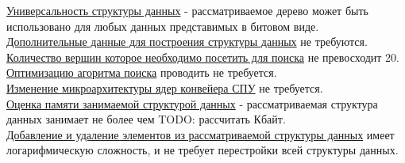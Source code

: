 \documentclass[a4peper, 12pt, titlepage, finall]{report}
\begin{document}
            \underline{Универсальность структуры данных} - рассматриваемое дерево может быть использовано для любых данных представимых в битовом виде.\\
            \underline{Дополнительные данные для построения структуры данных} не требуются.\\
            \underline{Количество вершин которое необходимо посетить для поиска} не превосходит 20.\\
            \underline{Оптимизацию агоритма поиска} проводить не требуется.\\
            \underline{Изменение микроархитектуры ядер конвейера СПУ} не требуется.\\
            \underline{Оценка памяти занимаемой структурой данных} - рассматриваемая структура данных занимает не более чем {\ttfamily TODO: рассчитать} Кбайт.\\
            \underline{Добавление и удаление элементов из рассматриваемой структуры данных} имеет логарифмическую сложность, и не требует перестройки всей структуры данных.\\
\end{document}
